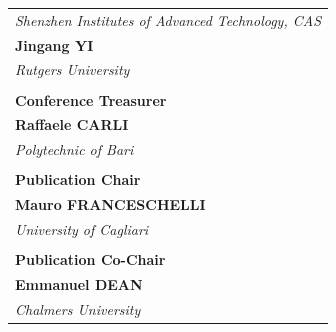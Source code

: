 \documentclass[
	openany, %
	parskip=full, %
	12pt, %
	a4paper, %
]{conferencebooklet} %
\begin{document}
\begin{table}[h!]
{\begin{tabular}{p{75mm}}
            \textit{Shenzhen Institutes of Advanced Technology, CAS} \vspace{2mm} \\ 
            \textbf{Jingang YI} \\
            \textit{Rutgers University} \vspace{2mm} \\ \\
            \large \textbf{Conference Treasurer} \\
            \textbf{Raffaele CARLI} \\
            \textit{Polytechnic of Bari} \\ \\
            \large \textbf{Publication Chair} \\
            \textbf{Mauro FRANCESCHELLI} \\ 
            \textit{University of Cagliari} \\ \\
            \large \textbf{Publication Co-Chair} \\
            \textbf{Emmanuel DEAN} \\ 
            \textit{Chalmers University}
        \end{tabular}
    } \hspace{10mm}
\end{table}
\end{document}
